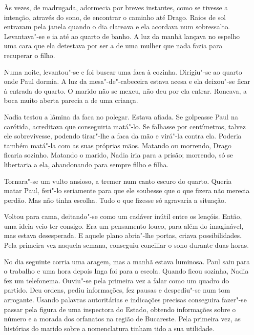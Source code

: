 Às vezes, de madrugada, adormecia por breves instantes, como se
tivesse a intenção, através do sono, de encontrar o caminho até Drago.
Raios de sol entravam pela janela quando o dia clareava e ela acordava
num sobressalto. Levantava"-se e ia até ao quarto de banho. A luz da
manhã lançava no espelho uma cara que ela detestava por ser a de uma
mulher que nada fazia para recuperar o filho.

Numa noite, levantou"-se e
foi buscar uma faca à cozinha. Dirigiu"-se ao quarto onde Paul dormia.
A luz da mesa"-de"-cabeceira estava acesa e ela deixou"-se ficar à entrada
do quarto. O marido não se mexeu, não deu por ela entrar. Roncava, a
boca muito aberta parecia a de uma criança.

Nadia testou a lâmina da faca no polegar. Estava afiada. Se golpeasse
Paul na carótida, acreditava que conseguiria matá"-lo. Se falhasse por
centímetros, talvez ele sobrevivesse, podendo tirar"-lhe a faca da mão
e virá"-la contra ela. Poderia também matá"-la com as suas próprias mãos.
Matando ou morrendo, Drago ficaria sozinho. Matando o marido, Nadia iria
para a prisão; morrendo, só se libertaria a ela, abandonando para
sempre filho e filha.

Tornara"-se um vulto ansioso, a tremer num canto escuro do quarto. Queria
matar Paul, feri"-lo seriamente para que ele soubesse que o que fizera
não merecia perdão. Mas não tinha escolha. Tudo o que fizesse só
agravaria a situação.

Voltou para cama, deitando"-se como um cadáver inútil entre os lençóis.
Então, uma ideia veio ter consigo. Era um pensamento louco, para além do
imaginável, mas estava desesperada. E aquele plano abria"-lhe portas,
criava possibilidades. Pela primeira vez naquela semana, conseguiu conciliar o sono
durante duas horas.

\bigskip

No dia seguinte corria uma aragem, mas a manhã estava luminosa. Paul
saiu para o trabalho e uma hora depois Inga foi para a escola. Quando
ficou sozinha, Nadia fez um telefonema. Ouviu"-se pela primeira vez a
falar como um quadro do partido. Deu ordens, pediu informações, fez
pausas e despediu"-se num tom arrogante. Usando palavras autoritárias e
indicações precisas conseguira fazer"-se passar pela figura de uma
inspectora do Estado, obtendo informações sobre o número e a morada dos
orfanatos na região de Bucareste. Pela primeira vez, as histórias do
marido sobre a nomenclatura tinham tido a sua utilidade.

